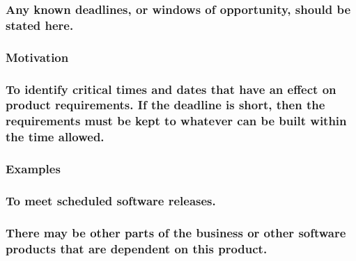 \documentclass[
]{article}
\begin{document}
\hypertarget{any-known-deadlines-or-windows-of-opportunity-should-be-stated-here.}{%
\subsubsection{\texorpdfstring{Any known deadlines, or windows of
opportunity, should be stated here.
}{Any known deadlines, or windows of opportunity, should be stated here. }}\label{any-known-deadlines-or-windows-of-opportunity-should-be-stated-here.}}

\hypertarget{motivation-15}{%
\subsubsection{Motivation}\label{motivation-15}}

\hypertarget{to-identify-critical-times-and-dates-that-have-an-effect-on-product-requirements.-if-the-deadline-is-short-then-the-requirements-must-be-kept-to-whatever-can-be-built-within-the-time-allowed.}{%
\subsubsection{To identify critical times and dates that have an effect
on product requirements. If the deadline is short, then the requirements
must be kept to whatever can be built within the time
allowed.}\label{to-identify-critical-times-and-dates-that-have-an-effect-on-product-requirements.-if-the-deadline-is-short-then-the-requirements-must-be-kept-to-whatever-can-be-built-within-the-time-allowed.}}

\hypertarget{examples-6}{%
\subsubsection{Examples}\label{examples-6}}

\hypertarget{to-meet-scheduled-software-releases.}{%
\subsubsection{To meet scheduled software
releases.}\label{to-meet-scheduled-software-releases.}}

\hypertarget{there-may-be-other-parts-of-the-business-or-other-software-products-that-are-dependent-on-this-product.}{%
\subsubsection{There may be other parts of the business or other
software products that are dependent on this
product.}\label{there-may-be-other-parts-of-the-business-or-other-software-products-that-are-dependent-on-this-product.}}
\end{document}
